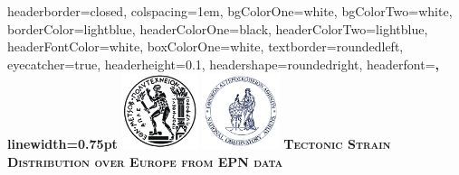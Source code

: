 \documentclass[landscape,a0paper,fontscale=0.315]{baposter} %
\begin{document}
\begin{poster}
{
headerborder=closed, %
colspacing=1em, %
bgColorOne=white, %
bgColorTwo=white, %
borderColor=lightblue, %
headerColorOne=black, %
headerColorTwo=lightblue, %
headerFontColor=white, %
boxColorOne=white, %
textborder=roundedleft, %
eyecatcher=true, %
headerheight=0.1\textheight, %
headershape=roundedright, %
headerfont=\Large\bf\textsc, %
linewidth=0.75pt %
}
%
{\includegraphics[height=6em]{../../logos/ntua.png} \includegraphics[height=6em]{../../logos/noa1.png}} %
{\bf\textsc{Tectonic Strain Distribution over Europe from EPN data}\vspace{0.3em} } %

\end{poster}
\end{document}
